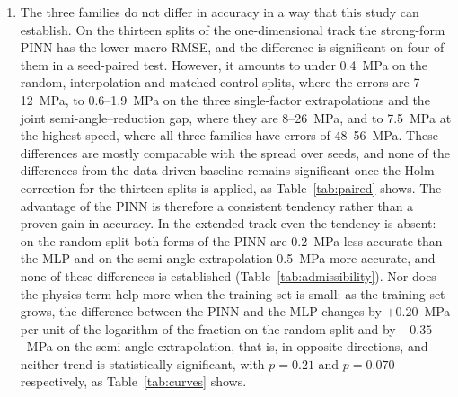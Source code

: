 \begin{enumerate}
\item The three families do not differ in accuracy in a way that this study can establish. On the thirteen splits of the one-dimensional track the strong-form PINN has the lower macro-RMSE, and the difference is significant on four of them in a seed-paired test. However, it amounts to under 0.4~MPa on the random, interpolation and matched-control splits, where the errors are 7--12~MPa, to 0.6--1.9~MPa on the three single-factor extrapolations and the joint semi-angle--reduction gap, where they are 8--26~MPa, and to 7.5~MPa at the highest speed, where all three families have errors of 48--56~MPa. These differences are mostly comparable with the spread over seeds, and none of the differences from the data-driven baseline remains significant once the Holm correction for the thirteen splits is applied, as Table~\ref{tab:paired} shows. The advantage of the PINN is therefore a consistent tendency rather than a proven gain in accuracy. In the extended track even the tendency is absent: on the random split both forms of the PINN are 0.2~MPa less accurate than the MLP and on the semi-angle extrapolation 0.5~MPa more accurate, and none of these differences is established (Table~\ref{tab:admissibility}). Nor does the physics term help more when the training set is small: as the training set grows, the difference between the PINN and the MLP changes by $+0.20$~MPa per unit of the logarithm of the fraction on the random split and by $-0.35$~MPa on the semi-angle extrapolation, that is, in opposite directions, and neither trend is statistically significant, with $p=0.21$ and $p=0.070$ respectively, as Table~\ref{tab:curves} shows. %


\end{enumerate}
